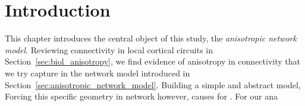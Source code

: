 
\section{Introduction}\label{sec:intro_model}

This chapter introduces the central object of this study, the
\textit{anisotropic network model}. Reviewing connectivity in local
cortical circuits in Section~\ref{sec:biol_anisotropy}, we find
evidence of anisotropy in connectivity that we try capture in the
network model introduced in
Section~\ref{sec:anisotropic_network_model}. Building a simple and
abstract model, Forcing this specific
geometry in network however, causes for . For our ana


